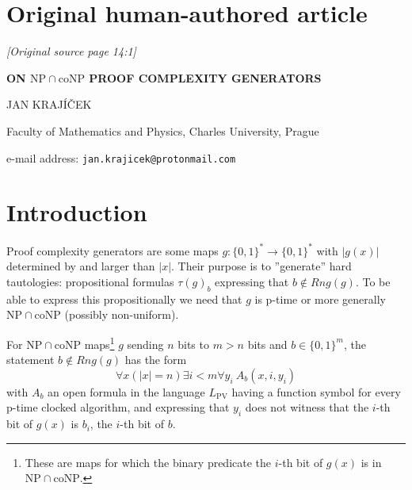 \documentclass[11pt]{article}
\newcommand{\LPV}{L_{\mathrm{PV}}}
\newcommand{\TAUT}{\mathrm{TAUT}}
\newcommand{\NP}{\mathrm{NP}}
\newcommand{\coNP}{\mathrm{coNP}}
\newcommand{\DDP}{\mathrm{DD}_P}
\newcommand{\Rng}{\mathit{Rng}}
\newcommand{\sourcepage}[1]{\par\Needspace{5\baselineskip}\bigskip\noindent\textit{[Original source page 14:#1]}\par\medskip}
\begin{document}
\section*{Original human-authored article}
\sourcepage{1}
\begin{center}
{\Large\bfseries ON $\NP\cap\coNP$ PROOF COMPLEXITY GENERATORS}\par\medskip
JAN KRAJÍČEK\par\smallskip
Faculty of Mathematics and Physics, Charles University, Prague\par
e-mail address: \texttt{jan.krajicek@protonmail.com}
\end{center}
\begin{abstract}
Motivated by the theory of proof complexity generators we consider the following $\Sigma^p_2$ search problem $\DDP$ determined by a propositional proof system $P$: given a $P$-proof $\pi$ of a disjunction $\bigvee_i\alpha_i$, no two $\alpha_i$ having an atom in common, find $i$ such that $\alpha_i\in\TAUT$.

We formulate a hypothesis (ST) that for some strong proof system $P$ the problem $\DDP$ is not solvable in the student-teacher model with a p-time student and a constant number of rounds. The hypothesis follows from the existence of hard one-way permutations.

We prove, using a model-theoretic assumption, that (ST) implies $\NP\ne\coNP$. The assumption concerns the existence of extensions of models of a bounded arithmetic theory and it is open at present if it holds.
\end{abstract}
\section*{Introduction}
Proof complexity generators are some maps $g:\{0,1\}^*\to\{0,1\}^*$ with $|g(x)|$ determined by and larger than $|x|$. Their purpose is to ”generate” hard tautologies: propositional formulas $\tau(g)_b$ expressing that $b\notin\Rng(g)$. To be able to express this propositionally we need that $g$ is p-time or more generally $\NP\cap\coNP$ (possibly non-uniform).

For $\NP\cap\coNP$ maps\footnote{These are maps for which the binary predicate the $i$-th bit of $g(x)$ is in $\NP\cap\coNP$.} $g$ sending $n$ bits to $m>n$ bits and $b\in\{0,1\}^m$, the statement $b\notin\Rng(g)$ has the form
\begin{equation}
\forall x(|x|=n)\exists i<m\forall y_i\ A_b(x,i,y_i)
\tag{0.1}\label{eq:01}
\end{equation}
with $A_b$ an open formula in the language $\LPV$ having a function symbol for every p-time clocked algorithm, and expressing that $y_i$ does not witness that the $i$-th bit of $g(x)$ is $b_i$, the $i$-th bit of $b$.
\end{document}
